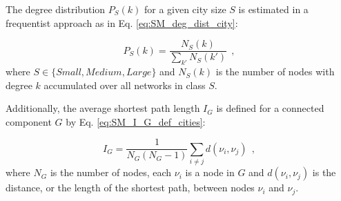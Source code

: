 The degree distribution $P_{S}(k)$ for a given city size $S$ is estimated in a frequentist approach as in Eq. \ref{eq:SM_deg_dist_city}:

\begin{equation}
	P_{S}(k) = \frac{N_S(k)}{\sum_{k'}N_S(k') } \ \ ,
	\label{eq:SM_deg_dist_city}
\end{equation}
where $S\in\{Small, Medium, Large\}$ and $N_S(k)$ is the number of nodes with degree $k$ accumulated over all networks in class $S$.

Additionally, the average shortest path length $I_G$ is defined for a connected component $G$ by Eq. \ref{eq:SM_I_G_def_cities}:

\begin{equation}
	I_G = \frac{1}{N_G(N_G-1)}\sum_{i\neq j}d(\nu_i, \nu_j) \ \ ,
	\label{eq:SM_I_G_def_cities}
\end{equation}
where $N_G$ is the number of nodes, each $\nu_i$ is a node in $G$ and $d(\nu_i, \nu_j)$ is the distance, or the length of the shortest path, between nodes $\nu_i$ and $\nu_j$.



\newpage



